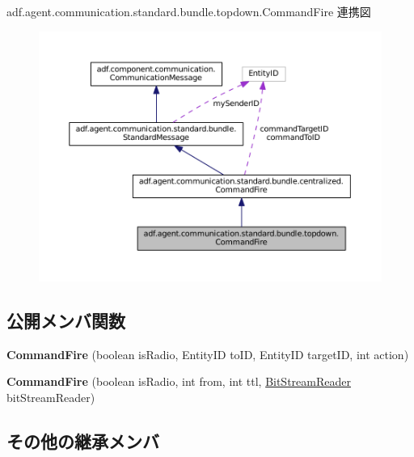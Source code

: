 adf.\+agent.\+communication.\+standard.\+bundle.\+topdown.\+Command\+Fire 連携図
\nopagebreak
\begin{figure}[H]
\begin{center}
\leavevmode
\includegraphics[width=350pt]{classadf_1_1agent_1_1communication_1_1standard_1_1bundle_1_1topdown_1_1CommandFire__coll__graph}
\end{center}
\end{figure}
\subsection*{公開メンバ関数}
\begin{DoxyCompactItemize}
\item 
\hypertarget{classadf_1_1agent_1_1communication_1_1standard_1_1bundle_1_1topdown_1_1CommandFire_a096f6d1f59e59d3e50d4aaa81627ffe5}{}\label{classadf_1_1agent_1_1communication_1_1standard_1_1bundle_1_1topdown_1_1CommandFire_a096f6d1f59e59d3e50d4aaa81627ffe5} 
{\bfseries Command\+Fire} (boolean is\+Radio, Entity\+ID to\+ID, Entity\+ID target\+ID, int action)
\item 
\hypertarget{classadf_1_1agent_1_1communication_1_1standard_1_1bundle_1_1topdown_1_1CommandFire_a7a3979249cfbe7491fcb6a25ba3b7260}{}\label{classadf_1_1agent_1_1communication_1_1standard_1_1bundle_1_1topdown_1_1CommandFire_a7a3979249cfbe7491fcb6a25ba3b7260} 
{\bfseries Command\+Fire} (boolean is\+Radio, int from, int ttl, \hyperlink{classadf_1_1component_1_1communication_1_1util_1_1BitStreamReader}{Bit\+Stream\+Reader} bit\+Stream\+Reader)
\end{DoxyCompactItemize}
\subsection*{その他の継承メンバ}


